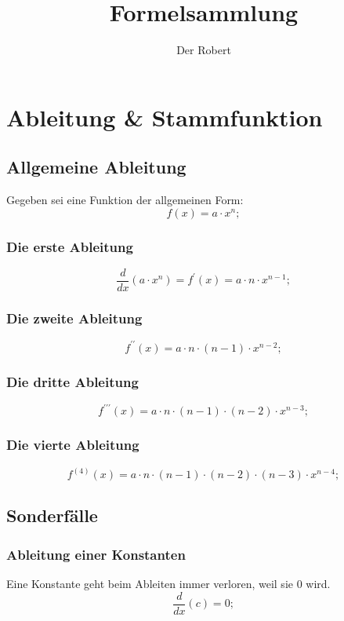 \documentclass[a4paper]{article}
\begin{document}
\setlength{\parindent}{0mm}

\title{Formelsammlung}
\author{Der Robert}
\maketitle

\tableofcontents
\newpage

\section{Ableitung \& Stammfunktion}

\subsection{Allgemeine Ableitung}

Gegeben sei eine Funktion der allgemeinen Form:
\[
	 f(x) = a \cdot x^n ; 
\]

\subsubsection{Die erste Ableitung}
\[
	\frac{d}{dx} \left( a \cdot x^n \right) = f^\prime(x) = a \cdot n \cdot x^{n - 1} ;
\]

\subsubsection{Die zweite Ableitung}
\[
	f^{\prime\prime}(x) = a \cdot n \cdot \left( n - 1 \right) \cdot x^{n - 2} ;
\]

\subsubsection{Die dritte Ableitung}
\[
	f^{\prime\prime\prime}(x) = a \cdot n \cdot \left( n - 1 \right) \cdot \left( n - 2 \right) \cdot x^{n-3} ;
\]

\subsubsection{Die vierte Ableitung}
\[
	f^{(4)}(x) = a \cdot n \cdot \left( n - 1 \right) \cdot \left( n - 2 \right) \cdot \left( n - 3 \right) \cdot x^{n - 4} ;
\]

\subsection{Sonderfälle}

\subsubsection{Ableitung einer Konstanten}
Eine Konstante geht beim Ableiten immer verloren, weil sie $0$ wird.
\[
	\frac{d}{dx} \left( c \right) = 0 ;
\]
\end{document}
